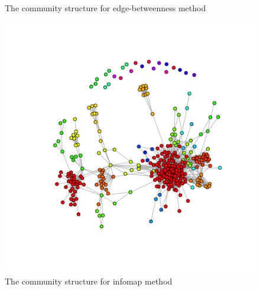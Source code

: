 \documentclass{article}
\begin{document}
\begin{figure}[htbp]
{\begin{minipage}[b]{0.4\textwidth}
\caption*{The community structure for edge-betweenness method}
\includegraphics[width=1\textwidth]{p4_2_ifc.png}
\caption*{The community structure for infomap method}
\end{minipage}
}
\end{figure}
\end{document}

